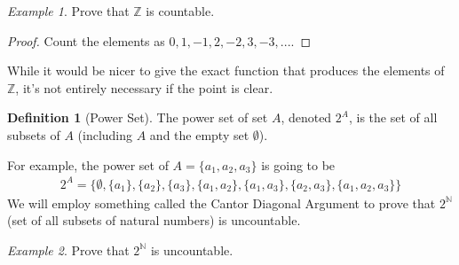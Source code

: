 \documentclass[11pt]{article}
\newcommand{\N}{\ensuremath{\mathbb N}}
\newcommand{\Z}{\ensuremath{\mathbb Z}}
\theoremstyle{plain}
\theoremstyle{definition}
\newtheorem{defi}{Definition}[section]
\theoremstyle{remark}
\newtheorem{exm}{Example}[section]
\begin{document}
\begin{exm}
    Prove that $\Z$ is countable.
\end{exm}
\begin{proof}
    Count the elements as $0, 1, -1, 2, -2, 3, -3, ...$. 
\end{proof}
While it would be nicer to give the exact function that produces the elements of $\Z$, it's not entirely necessary if the point is clear.
\begin{defi}[Power Set]
    The power set of set $A$, denoted $2^A$, is the set of all subsets of $A$ (including $A$ and the empty set $\emptyset$).
\end{defi}
For example, the power set of $A = \{a_1, a_2, a_3\}$ is going to be 
\begin{align*}
    2^A = \{\emptyset, \{a_1\}, \{a_2\}, \{a_3\}, \{a_1, a_2\}, \{a_1, a_3\}, \{a_2, a_3\}, \{a_1, a_2, a_3\}\}
\end{align*}
We will employ something called the Cantor Diagonal Argument to prove that $2^{\N}$ (set of all subsets of natural numbers) is uncountable.
\begin{exm}
    Prove that $2^{\N}$ is uncountable.
\end{exm}
\end{document}
